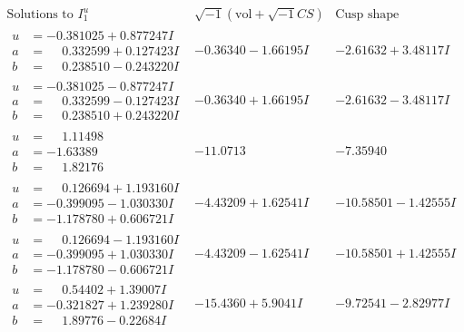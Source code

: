 \documentclass[1p]{elsarticle_modified}
\theoremstyle{definition}
\newcommand{\I}{\sqrt{-1}}
\begin{document}
$$\begin{array}{c|c|c}  
\text{Solutions to }I^u_{1}& \I (\text{vol} + \sqrt{-1}CS) & \text{Cusp shape}\\
 \hline 
\begin{aligned}
u &= -0.381025 + 0.877247 I \\
a &= \phantom{-}0.332599 + 0.127423 I \\
b &= \phantom{-}0.238510 - 0.243220 I\end{aligned}
 & -0.36340 - 1.66195 I & -2.61632 + 3.48117 I \\ \hline\begin{aligned}
u &= -0.381025 - 0.877247 I \\
a &= \phantom{-}0.332599 - 0.127423 I \\
b &= \phantom{-}0.238510 + 0.243220 I\end{aligned}
 & -0.36340 + 1.66195 I & -2.61632 - 3.48117 I \\ \hline\begin{aligned}
u &= \phantom{-}1.11498\phantom{ +0.000000I} \\
a &= -1.63389\phantom{ +0.000000I} \\
b &= \phantom{-}1.82176\phantom{ +0.000000I}\end{aligned}
 & -11.0713\phantom{ +0.000000I} & -7.35940\phantom{ +0.000000I} \\ \hline\begin{aligned}
u &= \phantom{-}0.126694 + 1.193160 I \\
a &= -0.399095 - 1.030330 I \\
b &= -1.178780 + 0.606721 I\end{aligned}
 & -4.43209 + 1.62541 I & -10.58501 - 1.42555 I \\ \hline\begin{aligned}
u &= \phantom{-}0.126694 - 1.193160 I \\
a &= -0.399095 + 1.030330 I \\
b &= -1.178780 - 0.606721 I\end{aligned}
 & -4.43209 - 1.62541 I & -10.58501 + 1.42555 I \\ \hline\begin{aligned}
u &= \phantom{-}0.54402 + 1.39007 I \\
a &= -0.321827 + 1.239280 I \\
b &= \phantom{-}1.89776 - 0.22684 I\end{aligned}
 & -15.4360 + 5.9041 I & -9.72541 - 2.82977 I \\ \hline\begin{aligned}

\end{aligned}
\end{array}$$
\end{document}
